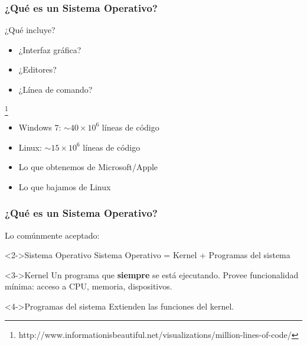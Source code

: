\documentclass[letter]{beamer}
\begin{document}
\begin{frame}
  \frametitle{¿Qué es un Sistema Operativo?}

  ¿Qué incluye?
  \begin{itemize}
    \item<2-> ¿Interfaz gráfica?
    \item<2-> ¿Editores?
    \item<2-> ¿Línea de comando?
  \end{itemize}
  
  \footnote{http://www.informationisbeautiful.net/visualizations/million-lines-of-code/}
  \begin{itemize}
    \item<4-> Windows 7: $\sim 40\times 10^6$ líneas de código
    \item<4-> Linux: $\sim 15 \times 10^6$ líneas de código
  \end{itemize}

  \begin{itemize}
    \item<4-> Lo que obtenemos de Microsoft/Apple
    \item<4-> Lo que bajamos de Linux
  \end{itemize}
\end{frame}

\begin{frame}
  \frametitle{¿Qué es un Sistema Operativo?}

  Lo comúnmente aceptado:
  \begin{alertblock}<2->{Sistema Operativo}
  Sistema Operativo = Kernel + Programas del sistema
  \end{alertblock}
  
  \begin{block}<3->{Kernel}
  Un programa que {\bf siempre} se está ejecutando.
  Provee funcionalidad mínima: acceso a CPU, memoria, dispositivos.
  \end{block}
  
  \begin{block}<4->{Programas del sistema}
  Extienden las funciones del kernel.
  \end{block}


\end{frame}
\end{document}
